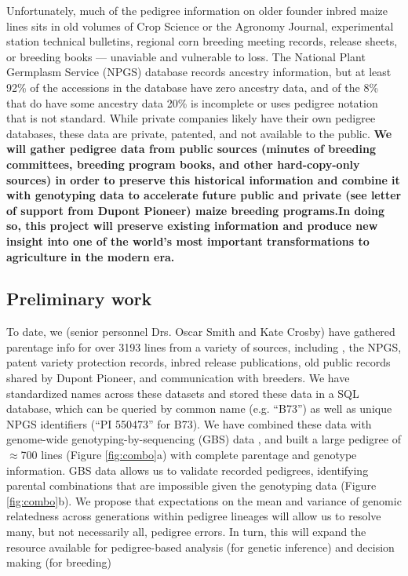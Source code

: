 \documentclass[12pt]{article}
\begin{document}
Unfortunately, much of the pedigree information on older founder inbred maize lines sits in old volumes of Crop Science or the Agronomy Journal, experimental station technical bulletins, regional corn breeding meeting records, release sheets, or breeding books --- unaviable and vulnerable to loss.  
The National Plant Germplasm Service (NPGS) database records ancestry information, but at least 92\% of the accessions in the database have zero ancestry data, and of the 8\% that do have some ancestry data 20\% is incomplete or uses pedigree notation that is not standard. 
While private companies likely have their own pedigree databases, these data are private, patented, and not available to the public. 
\textbf{We will gather pedigree data from public sources (minutes of breeding committees, breeding program books, and other hard-copy-only sources) in order to preserve this historical information and combine it with genotyping data to accelerate future public and private (see letter of support from Dupont Pioneer) maize breeding programs.In doing so, this project will preserve existing information and produce new insight into one of the world's most important transformations to agriculture in the modern era.}

\subsection*{Preliminary work}
To date, we (senior personnel Drs. Oscar Smith and Kate Crosby) have gathered parentage info for over 3193 lines from a variety of sources, including \cite{gerdes1993compilation}, the NPGS, patent variety protection records, inbred release publications, old public records shared by Dupont Pioneer, and communication with breeders.
We have standardized names across these datasets and stored these data in a SQL database, which can be queried by common name (e.g. ``B73'') as well as unique NPGS identifiers (``PI 550473'' for B73).
We have combined these data with genome-wide genotyping-by-sequencing (GBS) data \citep{romay2013comprehensive}, and built a large pedigree of $\approx$700 lines (Figure \ref{fig:combo}a) with complete parentage and genotype information. GBS data allows us to validate recorded pedigrees, identifying parental combinations that are impossible given the genotyping data (Figure \ref{fig:combo}b).
We propose that expectations on the mean and variance of genomic relatedness across generations within pedigree lineages will allow us to resolve many, but not necessarily all, pedigree errors. In turn, this will expand the resource available for pedigree-based analysis (for genetic inference) and decision making (for breeding)
\end{document}
